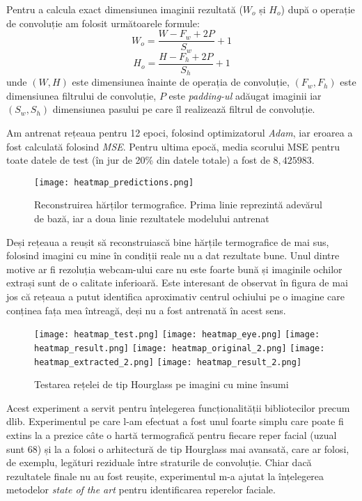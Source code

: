 Pentru a calcula exact dimensiunea imaginii rezultată ($W_o$ și $H_o$) după o operație de convoluție am folosit următoarele formule:
$$W_o = \frac{W - F_w + 2P}{S_w} + 1$$
$$H_o = \frac{H - F_h + 2P}{S_h} + 1$$
unde $(W, H)$ este dimensiunea înainte de operația de convoluție, $(F_w, F_h)$ este dimensiunea filtrului de convoluție, $P$ este \emph{padding-ul} adăugat imaginii iar $(S_w, S_h)$ dimensiunea pasului pe care îl realizează filtrul de convoluție.

Am antrenat rețeaua pentru 12 epoci, folosind optimizatorul \emph{Adam}, iar eroarea a fost calculată folosind \emph{MSE}.
Pentru ultima epocă, media scorului MSE pentru toate datele de test (în jur de 20\% din datele totale) a fost de $8,425983$.

\begin{figure}[H]
    \centering
    \texttt{[image: heatmap\_predictions.png]}
    \caption{Reconstruirea hărților termografice. Prima linie reprezintă adevărul de bază, iar a doua linie rezultatele modelului antrenat}
\end{figure}

Deși rețeaua a reușit să reconstruiască bine hărțile termografice de mai sus, folosind imagini cu mine în condiții reale nu a dat rezultate bune.
Unul dintre motive ar fi rezoluția webcam-ului care nu este foarte bună și imaginile ochilor extrași sunt de o calitate inferioară.
Este interesant de observat în figura de mai jos că rețeaua a putut identifica aproximativ centrul ochiului pe o imagine care conținea fața mea întreagă, deși nu a fost antrenată în acest sens.

\begin{figure}[h]
    \centering
    \texttt{[image: heatmap\_test.png]}
    \texttt{[image: heatmap\_eye.png]}
    \texttt{[image: heatmap\_result.png]}
    \texttt{[image: heatmap\_original\_2.png]}
    \texttt{[image: heatmap\_extracted\_2.png]}
    \texttt{[image: heatmap\_result\_2.png]}
    \caption{Testarea rețelei de tip Hourglass pe imagini cu mine însumi}
\end{figure}

Acest experiment a servit pentru înțelegerea funcționalității bibliotecilor precum dlib.
Experimentul pe care l-am efectuat a fost unul foarte simplu care poate fi extins la a prezice câte o hartă termografică pentru fiecare reper facial (uzual sunt 68) și la a folosi o arhitectură de tip Hourglass mai avansată, care ar folosi, de exemplu, legături reziduale între straturile de convoluție.
Chiar dacă rezultatele finale nu au fost reușite, experimentul m-a ajutat la înțelegerea metodelor \emph{state of the art} pentru identificarea reperelor faciale.